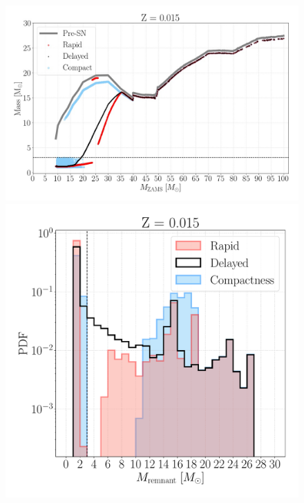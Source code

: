 \documentclass[a4paper,titlepage]{book}     	%
\begin{document}
\begin{figure}[t!]
\begin{minipage}{.39\textwidth}
	\end{minipage}
	\vfill
	\begin{minipage}{.60\textwidth}
		\centering
		\includegraphics[width=1.05\textwidth]{./images/remnants_Z015.jpg}
	\end{minipage}
	\hfill
	\begin{minipage}{.40\textwidth}
		\centering
		\includegraphics[width=1.05\textwidth]{./images/hist_Z015.pdf}	
	\end{minipage}

\end{figure}
\end{document}
